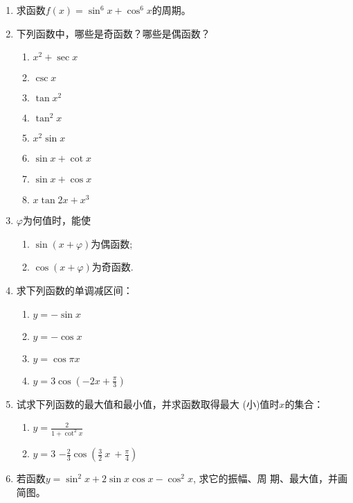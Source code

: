 \begin{enumerate}
\item 求函数$f(x)=\sin^6 x+\cos^6 x$的周期。 
\item 下列函数中，哪些是奇函数？哪些是偶函数？
\begin{multicols}{3}
\begin{enumerate}[(1)]
    \item $x^2+\sec x$
    \item $\csc x$
    \item $\tan x^2$
    \item $\tan^2 x$
    \item $x^2\sin x$
    \item $\sin x+\cot x$
    \item $\sin x+\cos x$
    \item $x\tan 2x+x^3$
\end{enumerate}
\end{multicols}
\item $\varphi$为何值时，能使
\begin{multicols}{2}
\begin{enumerate}[(1)]
    \item $\sin(x+\varphi)$为偶函数;
    \item $\cos(x+\varphi)$为奇函数.
\end{enumerate}
\end{multicols}
\item 求下列函数的单调减区间：
\begin{multicols}{2}
\begin{enumerate}[(1)]
    \item $y=-\sin x$
    \item $y=-\cos x$
    \item $y=\cos \pi x$
    \item $y=3\cos\left(-2x+\frac{\pi}{3}\right)$
\end{enumerate}
\end{multicols}

\item 试求下列函数的最大值和最小值，并求函数取得最大
(小)值时$x$的集合：
\begin{multicols}{2}
\begin{enumerate}[(1)]
\item $y= \frac 2{1+ \cot ^{2}x}$ 
\item  $y= 3$ $- \frac 23  \cos \left ( \frac 32\:x\:+ \frac \pi 4\right ) $
\end{enumerate}
\end{multicols}

\item 若函数$y=\sin^2x+2\sin x\cos x-\cos^2x$, 求它的振幅、周
期、最大值，并画简图。


\end{enumerate}
